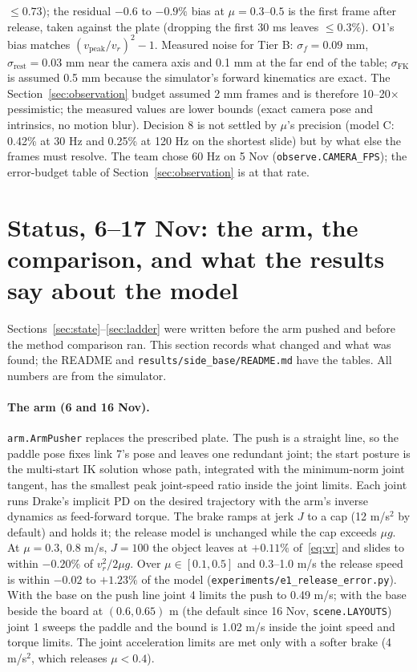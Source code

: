 \documentclass[10pt]{article}
\newcommand{\code}[1]{\texttt{#1}}
\begin{document}
$\le 0.73$); the residual $-0.6$ to $-0.9\%$ bias at $\mu = 0.3$--$0.5$ is the first frame after release, taken against the plate
(dropping the first 30 ms leaves $\le 0.3\%$).  O1's bias matches $(v_{\mathrm{peak}}/v_r)^2 - 1$.  Measured noise for Tier B:
$\sigma_f = 0.09$ mm, $\sigma_{\mathrm{rest}} = 0.03$ mm near the camera axis and 0.1 mm at the far end of the table; $\sigma_{\mathrm{FK}}$ is
assumed 0.5 mm because the simulator's forward kinematics are exact.  The Section~\ref{sec:observation} budget assumed 2 mm frames and
is therefore 10--20$\times$ pessimistic; the measured values are lower bounds (exact camera pose and intrinsics, no motion blur).
Decision 8 is not settled by $\mu$'s precision (model C: 0.42\% at 30 Hz and 0.25\% at 120 Hz on the shortest slide) but by what
else the frames must resolve.  The team chose 60 Hz on 5 Nov (\code{observe.CAMERA\_FPS}); the
error-budget table of Section~\ref{sec:observation} is at that rate.

\section{Status, 6--17 Nov: the arm, the comparison, and what the results say about the model}
\label{sec:status-nov}
Sections~\ref{sec:state}--\ref{sec:ladder} were written before the arm pushed and before the method comparison ran.
This section records what changed and what was found; the README and \code{results/side\_base/README.md} have the
tables.  All numbers are from the simulator.

\paragraph{The arm (6 and 16 Nov).}  \code{arm.ArmPusher} replaces the prescribed plate.  The push is a straight line, so
the paddle pose fixes link 7's pose and leaves one redundant joint; the start posture is the multi-start IK solution whose
path, integrated with the minimum-norm joint tangent, has the smallest peak joint-speed ratio inside the joint limits.
Each joint runs Drake's implicit PD on the desired trajectory with the arm's inverse dynamics as feed-forward torque.  The
brake ramps at jerk $J$ to a cap (12 m/s$^2$ by default) and holds it; the release model is unchanged while the cap
exceeds $\mu g$.  At $\mu=0.3$, 0.8 m/s, $J=100$ the object leaves at $+0.11\%$ of~\eqref{eq:vr} and slides to within
$-0.20\%$ of $v_r^2/2\mu g$.  Over $\mu\in[0.1,0.5]$ and 0.3--1.0 m/s the release speed is within $-0.02$ to $+1.23\%$ of
the model (\code{experiments/e1\_release\_error.py}).  With the base on the push line joint 4 limits the push to 0.49 m/s;
with the base beside the board at $(0.6, 0.65)$ m (the default since 16 Nov, \code{scene.LAYOUTS}) joint 1 sweeps the
paddle and the bound is 1.02 m/s inside the joint speed and torque limits.  The joint acceleration limits are met only
with a softer brake (4 m/s$^2$, which releases $\mu<0.4$).
\end{document}
